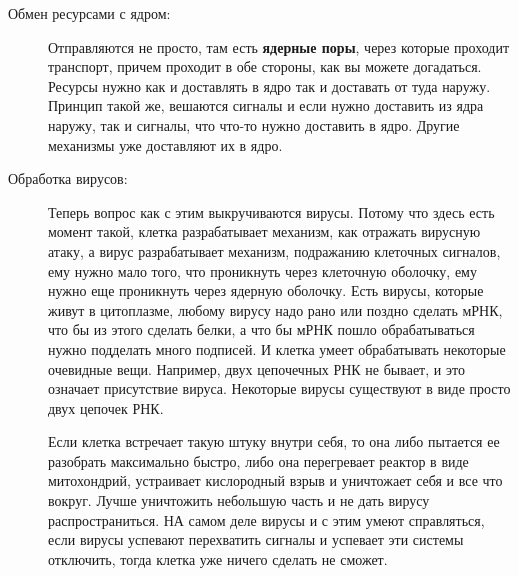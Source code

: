 \begin{description}
\item[Обмен ресурсами с ядром:]
Отправляются не просто, там есть \textbf{ядерные поры}, через которые проходит транспорт, 
причем проходит в обе стороны, как вы можете догадаться. Ресурсы нужно как и доставлять 
в ядро так и доставать от туда наружу. Принцип такой же, вешаются 
сигналы и если нужно доставить из ядра наружу, так и 
сигналы, что что-то нужно доставить в ядро. Другие механизмы уже доставляют их в ядро.  
\item[Обработка вирусов:]
Теперь вопрос как с этим выкручиваются вирусы. Потому что здесь 
есть момент такой, клетка разрабатывает механизм, как
отражать вирусную атаку, а вирус разрабатывает 
механизм, подражанию клеточных сигналов, ему нужно 
мало того, что проникнуть через клеточную оболочку, ему нужно 
еще проникнуть через ядерную оболочку. Есть вирусы, которые
живут в цитоплазме, любому вирусу надо рано или 
поздно сделать мРНК, что бы из этого 
сделать белки, а что бы мРНК пошло обрабатываться нужно подделать 
много подписей. И клетка умеет обрабатывать некоторые очевидные вещи. 
Например, двух цепочечных РНК не бывает, и это означает присутствие 
вируса. Некоторые вирусы существуют в виде просто двух цепочек РНК. 

Если клетка встречает такую штуку внутри себя, то она 
либо пытается ее разобрать максимально быстро, либо она перегревает 
реактор в виде митохондрий, устраивает кислородный взрыв и уничтожает себя и 
все что вокруг. Лучше уничтожить небольшую часть и не дать вирусу распространиться. 
НА самом деле вирусы и с этим умеют справляться, если 
вирусы успевают перехватить сигналы и успевает эти системы отключить, 
тогда клетка уже ничего сделать не сможет. 

\end{description}

